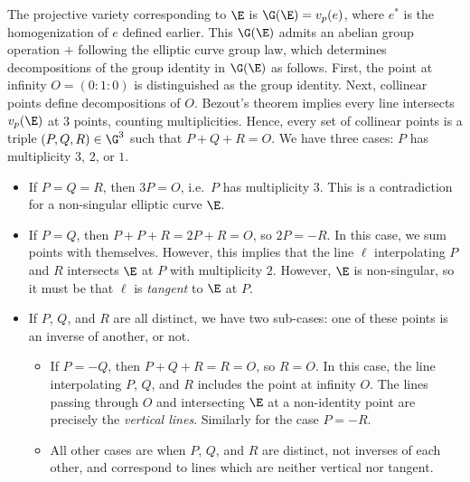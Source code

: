 \documentclass[11pt,letterpaper]{article}
\theoremstyle{definition}
\newcommand{\6}{\mathbf}
\newcommand{\7}{\mathcal}
\begin{document}
The projective variety corresponding to $\E$ is $\G(\E) = v_p(e)$, where $e^*$ is the homogenization of $e$ defined earlier. This $\G(\E)$ admits an abelian group operation $+$ following the elliptic curve group law, which determines decompositions of the group identity in $\G(\E)$ as follows. First, the point at infinity $O=(0\!:\!1\!:\!0)$ is distinguished as the group identity. Next, collinear points define decompositions of $O$. Bezout's theorem implies every line intersects $v_p(\E)$ at $3$ points, counting multiplicities. Hence, every set of collinear points is a triple $(P, Q, R) \in \G^3$ such that $P + Q + R = O$. We have three cases: $P$ has multiplicity $3$, $2$, or $1$.
\begin{itemize}
\item If $P = Q = R$, then $3P = O$, i.e.\ $P$ has multiplicity $3$. This is a contradiction for a non-singular elliptic curve $\E$.
\item If $P = Q$, then $P + P + R = 2P + R = O$, so $2P = -R$. In this case, we sum points with themselves. However, this implies that the line $\ell$ interpolating $P$ and $R$ intersects $\E$ at $P$ with multiplicity $2$. However, $\E$ is non-singular, so it must be that $\ell$ is \textit{tangent} to $\E$ at $P$.
\item If $P$, $Q$, and $R$ are all distinct, we have two sub-cases: one of these points is an inverse of another, or not.
\begin{itemize}
\item If $P = -Q$, then $P + Q + R = R = O$, so $R = O$. In this case, the line interpolating $P$, $Q$, and $R$ includes the point at infinity $O$. The lines passing through $O$ and intersecting $\E$ at a non-identity point are precisely the \textit{vertical lines}. Similarly for the case $P = -R$. 
\item All other cases are when $P$, $Q$, and $R$ are distinct, not inverses of each other, and correspond to lines which are neither vertical nor tangent. 
\end{itemize}
\end{itemize}
\end{document}
